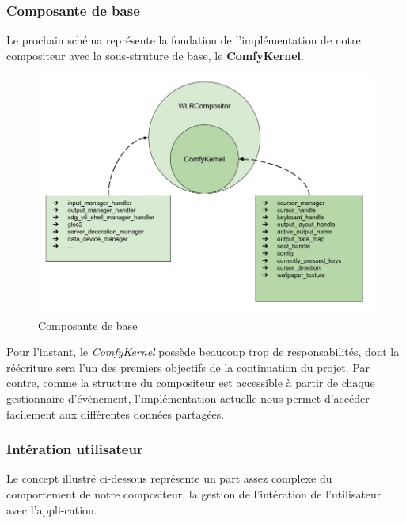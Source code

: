 \documentclass[titlepage]{article}
\begin{document}
\subsubsection{Composante de base}
\par
Le prochain schéma représente la fondation de l'implémentation de notre compositeur avec la sous-struture de base, le \textbf{ComfyKernel}.
\bigskip

\begin{figure}[H]
	\centering
	\includegraphics[width=\textwidth]{architecture_base.jpg}
	\caption{Composante de base}
\end{figure}

\par
Pour l'instant, le \textit{ComfyKernel} possède beaucoup trop de responsabilités, dont la réécriture sera l'un des premiers objectifs de la continuation du projet. Par contre, comme la structure du compositeur est accessible à partir de chaque gestionnaire d'évènement, l'implémentation actuelle nous permet d'accéder facilement aux différentes données partagées.
\bigskip

\subsubsection{Intération utilisateur}
\par
Le concept illustré ci-dessous représente un part assez complexe du comportement de notre compositeur, la gestion de l'intération de l'utilisateur avec l'appli-cation.
\bigskip
\end{document}
